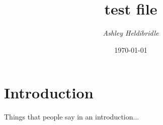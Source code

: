\documentclass[12pt]{article}
\title{test file}
\author{\textit{Ashley Heldibridle}}
\date{\today}
\begin{document}
\maketitle

\section{Introduction}
Things that people say in an introduction...
\end{document}
